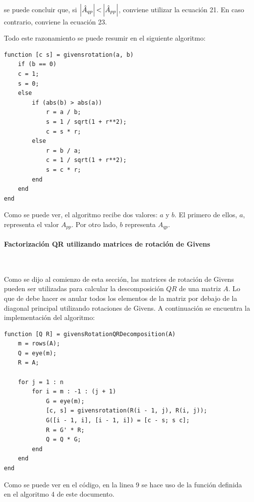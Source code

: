 \documentclass[spanish]{article}
\newcommand\abs[1]{\left|#1\right|}
\begin{document}
            se puede concluir que, si $\abs{\hat{A}_{q p}} \text{\textless} \abs{\hat{A}_{p p}}$, conviene utilizar la ecuación 21. En caso contrario, conviene la ecuación 23.
            
            \par Todo este razonamiento se puede resumir en el siguiente algoritmo:
            \begin{lstlisting}[caption = Cálculo de los elementos $c$ y $s$ de una matriz de rotación de Givens]
function [c s] = givensrotation(a, b)
    if (b == 0)
    c = 1;
    s = 0;
    else
        if (abs(b) > abs(a))
            r = a / b;
            s = 1 / sqrt(1 + r**2);
            c = s * r;
        else
            r = b / a;
            c = 1 / sqrt(1 + r**2);
            s = c * r;
        end
    end
end
            \end{lstlisting}
            
            \par Como se puede ver, el algoritmo recibe dos valores: $a$ y $b$. El primero de ellos, $a$, representa el valor $A_{p p}$. Por otro lado, $b$ representa $A_{q p}$. 
            
            
            \paragraph{Factorización QR utilizando matrices de rotación de Givens} ~
            \par Como se dijo al comienzo de esta sección, las matrices de rotación de Givens pueden ser utilizadas para calcular la descomposición $QR$ de una matriz $A$. Lo que de debe hacer es anular todos los elementos de la matriz por debajo de la diagonal principal utilizando rotaciones de Givens. A continuación se encuentra la implementación del algoritmo:
            

            \begin{lstlisting}[caption = Descomposición en $QR$ con rotaciones de Givens]
function [Q R] = givensRotationQRDecomposition(A)
    m = rows(A);
    Q = eye(m);
    R = A;

    for j = 1 : n
        for i = m : -1 : (j + 1)
            G = eye(m);
            [c, s] = givensrotation(R(i - 1, j), R(i, j));
            G([i - 1, i], [i - 1, i]) = [c - s; s c];
            R = G' * R;
            Q = Q * G;
        end
    end
end
            \end{lstlisting}
            
            \par Como se puede ver en el código, en la linea 9 se hace uso de la función definida en el algoritmo 4 de este documento.
\end{document}
